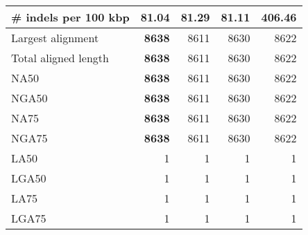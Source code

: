 \documentclass[12pt,a4paper]{article}
\begin{document}
\begin{table}[ht]
\begin{center}
\begin{tabular}{|l*{4}{|r}|}
\# indels per 100 kbp & {\bf 81.04} & 81.29 & 81.11 & 406.46 \\ \hline
Largest alignment & {\bf 8638} & 8611 & 8630 & 8622 \\ \hline
Total aligned length & {\bf 8638} & 8611 & 8630 & 8622 \\ \hline
NA50 & {\bf 8638} & 8611 & 8630 & 8622 \\ \hline
NGA50 & {\bf 8638} & 8611 & 8630 & 8622 \\ \hline
NA75 & {\bf 8638} & 8611 & 8630 & 8622 \\ \hline
NGA75 & {\bf 8638} & 8611 & 8630 & 8622 \\ \hline
LA50 & 1 & 1 & 1 & 1 \\ \hline
LGA50 & 1 & 1 & 1 & 1 \\ \hline
LA75 & 1 & 1 & 1 & 1 \\ \hline
LGA75 & 1 & 1 & 1 & 1 \\ \hline
\end{tabular}
\end{center}
\end{table}
\end{document}
